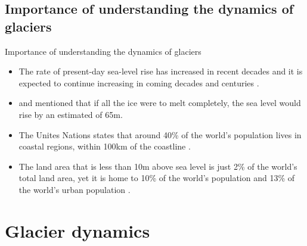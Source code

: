 \documentclass[11pt]{beamer}
\begin{document}
	\subsection{Importance of understanding the dynamics of glaciers}
		\begin{frame}{Importance of understanding the dynamics of glaciers}
		\justifying
		\begin{itemize}
			\item The rate of present-day sea-level rise has increased in recent decades and it is expected to continue increasing in coming decades and centuries \cite[]{clark2015recent}.
			\item \cite{morlighem2017bedmachine} and \cite{haywood2011pliocene} mentioned that if all the ice were to melt completely, the sea level would rise by an estimated of 65m.
			\item The Unites Nations states that around 40\% of the world's population lives in coastal regions, within 100km of the coastline \cite[]{barbier2015climate, montgomery2007united}.
			\item The land area that is less than 10m above sea level is just 2\% of the world's total land area, yet it is home to 10\% of the world's population and 13\% of the world's urban population \cite[]{nevermann2023land}.
		\end{itemize}
		\end{frame}
	\section{Glacier dynamics}
\end{document}
